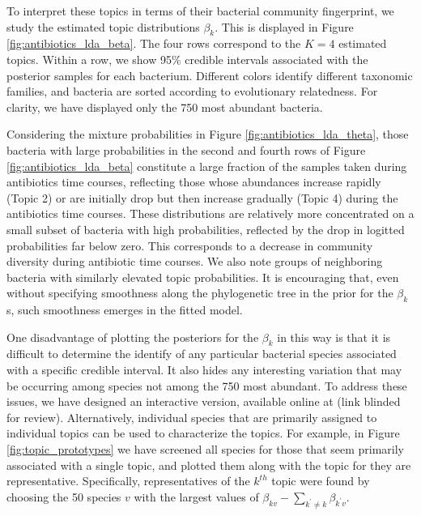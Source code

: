 \documentclass[oupdraft]{bio}
\begin{document}
To interpret these topics in terms of their bacterial community fingerprint, we
study the estimated topic distributions $\beta_{k}$. This is displayed in Figure
\ref{fig:antibiotics_lda_beta}. The four rows correspond to the $K = 4$
estimated topics. Within a row, we show 95\% credible intervals associated with
the posterior samples for each bacterium. Different colors identify different
taxonomic families, and bacteria are sorted according to evolutionary
relatedness. For clarity, we have displayed only the 750 most abundant bacteria.

Considering the mixture probabilities in Figure \ref{fig:antibiotics_lda_theta},
those bacteria with large probabilities in the second and fourth rows of Figure
\ref{fig:antibiotics_lda_beta} constitute a large fraction of the samples taken
during antibiotics time courses, reflecting those whose abundances increase
rapidly (Topic 2) or are initially drop but then increase gradually (Topic 4)
during the antibiotics time courses. These distributions are relatively more
concentrated on a small subset of bacteria with high probabilities, reflected by
the drop in logitted probabilities far below zero. This corresponds to a
decrease in community diversity during antibiotic time courses. We also note
groups of neighboring bacteria with similarly elevated topic probabilities. It
is encouraging that, even without specifying smoothness along the phylogenetic
tree in the prior for the $\beta_{k}$s, such smoothness emerges in the fitted
model.

One disadvantage of plotting the posteriors for the $\beta_{k}$ in this way is
that it is difficult to determine the identify of any particular bacterial
species associated with a specific credible interval. It also hides any
interesting variation that may be occurring among species not among the 750 most
abundant. To address these issues, we have designed an interactive version,
available online at
(link blinded for review).
Alternatively,
individual species that are primarily assigned to individual topics can be used
to characterize the topics. For example, in Figure \ref{fig:topic_prototypes} we
have screened all species for those that seem primarily associated with a single
topic, and plotted them along with the topic for they are representative.
Specifically, representatives of the $k^{th}$ topic were found by choosing the
50 species $v$ with the largest values of $\beta_{kv} - \sum_{k^{\prime} \neq k}
\beta_{k^{\prime} v}$.
\end{document}
